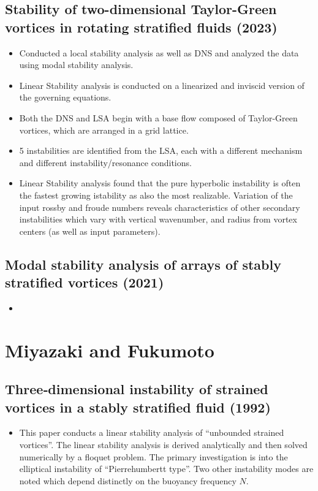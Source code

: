 \documentclass{article}
\begin{document}
    \subsection{Stability of two-dimensional Taylor-Green vortices in rotating
    stratified fluids (2023)}
    \begin{itemize}
        \item Conducted a local stability analysis as well as DNS and analyzed the
        data using modal stability analysis. 
        \item Linear Stability analysis is conducted on a linearized and inviscid
        version of the governing equations.
        \item Both the DNS and LSA begin with a base flow composed of Taylor-Green
        vortices, which are arranged in a grid lattice. 
        \item 5 instabilities are identified from the LSA, each with a different
        mechanism and different instability/resonance conditions. 
        \item Linear Stability analysis found that the pure hyperbolic instability
        is often the fastest growing istability as also the most realizable.
        Variation of the input rossby and froude numbers reveals characteristics of
        other secondary instabilities which vary with vertical wavenumber, and
        radius from vortex centers (as well as input parameters). 
    \end{itemize}

    \subsection{Modal stability analysis of arrays of stably stratified vortices
    (2021)}
    \begin{itemize}
        \item 
    \end{itemize}


\section{Miyazaki and Fukumoto}
    \subsection{Three‐dimensional instability of strained vortices in a stably
    stratified fluid (1992)}
    \begin{itemize}
        \item This paper conducts a linear stability analysis of ``unbounded
        strained vortices''. The linear stability analysis is derived analytically
        and then solved numerically by a floquet problem. The primary investigation
        is into the elliptical instability of ``Pierrehumbertt type''. Two other
        instability modes are noted which depend distinctly on the buoyancy
        frequency $N$.
    \end{itemize}
\end{document}
